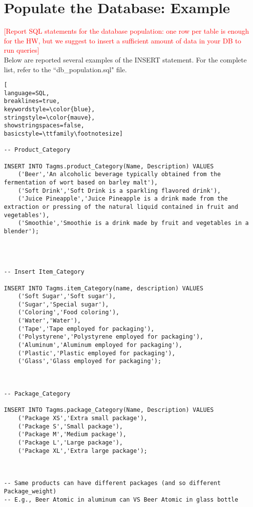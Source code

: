 
\section{Populate the Database: Example}
\textcolor{red}{[Report SQL statements for the database population: one row per table is enough for the HW, but we suggest to insert a sufficient amount of data in your DB to run queries]}\\
Below are reported several examples of the INSERT statement. For the complete list, refer to the ``db\_population.sql" file.


\begin{lstlisting}[
language=SQL,
breaklines=true,
keywordstyle=\color{blue},
stringstyle=\color{mauve},
showstringspaces=false,
basicstyle=\ttfamily\footnotesize]

-- Product_Category

INSERT INTO Tagms.product_Category(Name, Description) VALUES
    ('Beer','An alcoholic beverage typically obtained from the fermentation of wort based on barley malt'),
    ('Soft Drink','Soft Drink is a sparkling flavored drink'),
    ('Juice Pineapple','Juice Pineapple is a drink made from the extraction or pressing of the natural liquid contained in fruit and vegetables'),
    ('Smoothie','Smoothie is a drink made by fruit and vegetables in a blender');




-- Insert Item_Category

INSERT INTO Tagms.item_Category(name, description) VALUES
    ('Soft Sugar','Soft sugar'),
    ('Sugar','Special sugar'),
    ('Coloring','Food coloring'),
    ('Water','Water'),
    ('Tape','Tape employed for packaging'),
    ('Polystyrene','Polystyrene employed for packaging'),
    ('Aluminum','Aluminum employed for packaging'),
    ('Plastic','Plastic employed for packaging'),
    ('Glass','Glass employed for packaging');



-- Package_Category

INSERT INTO Tagms.package_Category(Name, Description) VALUES
    ('Package XS','Extra small package'),
    ('Package S','Small package'),
    ('Package M','Medium package'),
    ('Package L','Large package'),
    ('Package XL','Extra large package');



-- Same products can have different packages (and so different Package_weight)
-- E.g., Beer Atomic in aluminum can VS Beer Atomic in glass bottle


\end{lstlisting}
